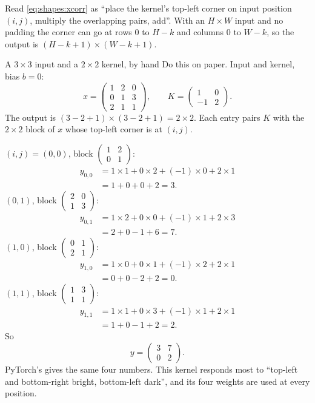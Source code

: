Read \cref{eq:shapes:xcorr} as ``place the kernel's top-left corner on input position $(i,j)$,
multiply the overlapping pairs, add''. With an $H\times W$ input and no padding the corner can go at
rows $0$ to $H-k$ and columns $0$ to $W-k$, so the output is $(H-k+1)\times(W-k+1)$.

\begin{worked}[label={we:shapes:conv}]{A $3\times3$ input and a $2\times2$ kernel, by hand}
Do this on paper. Input and kernel, bias $b=0$:
\[
x = \begin{pmatrix}1&2&0\\0&1&3\\2&1&1\end{pmatrix},\qquad
K = \begin{pmatrix}1&0\\-1&2\end{pmatrix}.
\]
The output is $(3-2+1)\times(3-2+1) = 2\times2$. Each entry pairs $K$ with the $2\times2$ block of $x$
whose top-left corner is at $(i,j)$.

$(i,j)=(0,0)$, block $\begin{pmatrix}1&2\\0&1\end{pmatrix}$:
\begin{align*}
y_{0,0} &= 1\times1 + 0\times2 + (-1)\times0 + 2\times1\\
&= 1 + 0 + 0 + 2 = 3.
\end{align*}
$(0,1)$, block $\begin{pmatrix}2&0\\1&3\end{pmatrix}$:
\begin{align*}
y_{0,1} &= 1\times2 + 0\times0 + (-1)\times1 + 2\times3\\
&= 2 + 0 - 1 + 6 = 7.
\end{align*}
$(1,0)$, block $\begin{pmatrix}0&1\\2&1\end{pmatrix}$:
\begin{align*}
y_{1,0} &= 1\times0 + 0\times1 + (-1)\times2 + 2\times1\\
&= 0 + 0 - 2 + 2 = 0.
\end{align*}
$(1,1)$, block $\begin{pmatrix}1&3\\1&1\end{pmatrix}$:
\begin{align*}
y_{1,1} &= 1\times1 + 0\times3 + (-1)\times1 + 2\times1\\
&= 1 + 0 - 1 + 2 = 2.
\end{align*}
So
\[
y = \begin{pmatrix}3&7\\0&2\end{pmatrix}.
\]
PyTorch's  gives the same four numbers\tagC. This kernel responds most to ``top-left and
bottom-right bright, bottom-left dark'', and its four weights are used at every position.
\end{worked}


